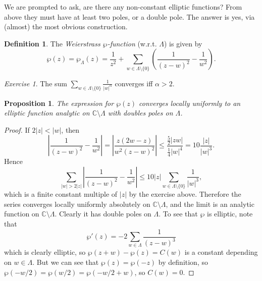 \documentclass[a4paper]{article}
\theoremstyle{plain}
\newtheorem{proposition}[theorem]{Proposition}
\theoremstyle{remark}
\newtheorem*{exercise}{Exercise}
\theoremstyle{definition}
\newtheorem*{definition}{Definition}
\newcommand{\C}{\mathbb{C}}
\begin{document}
We are prompted to ask, are there any non-constant elliptic functions? From
above they must have at least two poles, or a double pole. The answer is yes,
via (almost) the most obvious construction.

\begin{definition}
    The \emph{Weierstrass $\wp$-function} (w.r.t. $\Lambda$) is given by
    \begin{equation*}
        \wp(z) = \wp_\Lambda(z)
            = \frac{1}{z^2} + \sum_{w\in\Lambda\setminus\{0\}}
                \left(\frac{1}{(z-w)^2}-\frac{1}{w^2}\right).
    \end{equation*}
\end{definition}

\begin{exercise}
    The sum $\sum_{w\in\Lambda\setminus\{0\}}\frac{1}{|w|^\alpha}$ converges iff
    $\alpha>2$.
\end{exercise}

\begin{proposition}
    The expression for $\wp(z)$ converges locally uniformly to an elliptic
    function analytic on $\C\setminus\Lambda$ with doubles poles on $\Lambda$.
\end{proposition}

\begin{proof}
    If $2|z|<|w|$, then
    \begin{equation*}
        \left|\frac{1}{(z-w)^2}-\frac{1}{w^2}\right|
            = \left|\frac{z(2w-z)}{w^2(z-w)^2}\right|
            \le \frac{\frac{5}{2}|zw|}{\frac{1}{4}|w|^4}
            = 10\frac{|z|}{|w|^3}.
    \end{equation*}
    Hence
    \begin{equation*}
        \sum_{|w|>2|z|}\left|\frac{1}{(z-w)^2}-\frac{1}{w^2}\right|
        \le 10|z|\sum_{w\in\Lambda\setminus\{0\}}\frac{1}{|w|^3},
    \end{equation*}
    which is a finite constant multiple of $|z|$ by the exercise above.
    Therefore the series converges locally uniformly absolutely on
    $\C\setminus\Lambda$, and the limit is an analytic function on
    $\C\setminus\Lambda$. Clearly it has double poles on $\Lambda$. To see that
    $\wp$ is elliptic, note that
    \begin{equation*}
        \wp'(z) = -2\sum_{w\in\Lambda}\frac{1}{(z-w)^3}
    \end{equation*}
    which is clearly elliptic, so $\wp(z+w)-\wp(z)=C(w)$ is a constant depending
    on $w\in\Lambda$. But we can see that $\wp(z)=\wp(-z)$ by definition, so
    $\wp(-w/2)=\wp(w/2)=\wp(-w/2+w)$, so $C(w)=0$.
\end{proof}
\end{document}
